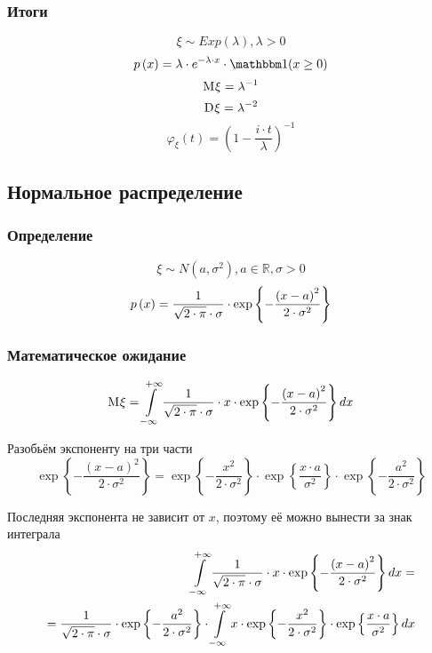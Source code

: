 \subsubsection{Итоги}
$$\xi \sim Exp\left( \lambda \right), \lambda>0$$
$$\pdf{x} = \lambda \cdot e^{-\lambda \cdot x} \cdot \indicator{x \ge 0}$$
$$\mean{\xi} = \lambda^{-1}$$
$$\dispersion{\xi} = \lambda^{-2}$$
$$\varphi_{\xi}\left( t \right)
    = \left( 1 - \frac{i \cdot t}{\lambda} \right)^{-1}$$

\subsection{Нормальное распределение}
\subsubsection{Определение}
$$\xi \sim N\left( a, \sigma^2 \right), a \in \mathbb{R}, \sigma > 0$$
$$\pdf{x}
    = \frac{1}{\sqrt{2 \cdot \pi} \cdot \sigma}
        \cdot \exp{\left\{ -\frac{\left( x-a \right)^2}
            {2 \cdot \sigma^2} \right\}}$$
\subsubsection{Математическое ожидание}
$$\mean{\xi}
    = \integral{-\infty}{+\infty}{x}{
        \frac{1}{\sqrt{2 \cdot \pi} \cdot \sigma}
            \cdot x \cdot \exp{\left\{
                -\frac{\left( x-a \right)^2}{2 \cdot \sigma^2} \right\}}}$$

Разобьём экспоненту на три части
$$\exp{\left\{-\frac{\left( x-a \right)^2}{2 \cdot \sigma^2} \right\}}
    = \exp{\left\{ - \frac{x^2}{2 \cdot \sigma^2} \right\}}
        \cdot \exp{\left\{ \frac{x \cdot a}{\sigma^2} \right\}}
        \cdot \exp{\left\{ - \frac{a^2}{2 \cdot \sigma^2} \right\}}$$

Последняя экспонента не зависит от $x$,
поэтому её можно вынести за знак интеграла
\begin{align*}
    \integral{-\infty}{+\infty}{x}{
        \frac{1}{\sqrt{2 \cdot \pi} \cdot \sigma}
            \cdot x \cdot \exp{\left\{
                -\frac{\left( x-a \right)^2}{2 \cdot \sigma^2} \right\}}} = \\
        = \frac{1}{\sqrt{2 \cdot \pi} \cdot \sigma}
                \cdot \exp{\left\{ - \frac{a^2}{2 \cdot \sigma^2} \right\}}
            \cdot \integral{-\infty}{+\infty}{x}{
                x \cdot \exp{\left\{ - \frac{x^2}{2 \cdot \sigma^2} \right\}}
                \cdot \exp{\left\{ \frac{x \cdot a}{\sigma^2} \right\}}}
\end{align*}

